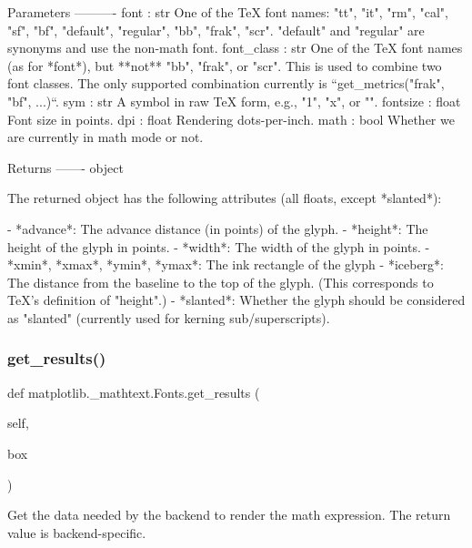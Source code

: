 \begin{DoxyVerb}Parameters
----------
font : str
    One of the TeX font names: "tt", "it", "rm", "cal", "sf", "bf",
    "default", "regular", "bb", "frak", "scr".  "default" and "regular"
    are synonyms and use the non-math font.
font_class : str
    One of the TeX font names (as for *font*), but **not** "bb",
    "frak", or "scr".  This is used to combine two font classes.  The
    only supported combination currently is ``get_metrics("frak", "bf",
    ...)``.
sym : str
    A symbol in raw TeX form, e.g., "1", "x", or "\sigma".
fontsize : float
    Font size in points.
dpi : float
    Rendering dots-per-inch.
math : bool
    Whether we are currently in math mode or not.

Returns
-------
object

    The returned object has the following attributes (all floats,
    except *slanted*):

    - *advance*: The advance distance (in points) of the glyph.
    - *height*: The height of the glyph in points.
    - *width*: The width of the glyph in points.
    - *xmin*, *xmax*, *ymin*, *ymax*: The ink rectangle of the glyph
    - *iceberg*: The distance from the baseline to the top of the
      glyph.  (This corresponds to TeX's definition of "height".)
    - *slanted*: Whether the glyph should be considered as "slanted"
      (currently used for kerning sub/superscripts).
\end{DoxyVerb}
 \mbox{\label{classmatplotlib_1_1__mathtext_1_1Fonts_afc8444ade4a0cdd7a891f3761b53d290}} 
\subsubsection{\texorpdfstring{get\+\_\+results()}{get\_results()}}
{\footnotesize\ttfamily def matplotlib.\+\_\+mathtext.\+Fonts.\+get\+\_\+results (\begin{DoxyParamCaption}\item[{}]{self,  }\item[{}]{box }\end{DoxyParamCaption})}

\begin{DoxyVerb}Get the data needed by the backend to render the math
expression.  The return value is backend-specific.
\end{DoxyVerb}
 \mbox{\label{classmatplotlib_1_1__mathtext_1_1Fonts_ac13329029c44c7ea107a297e78db3a8a}} 
